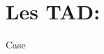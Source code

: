 \documentclass[a4paper,10pts]{article}
\title{}
\author{Simon Lebeaud}
\date{}
\begin{document}
	\maketitle
	\newpage
	\tableofcontents
	\section{Les TAD:}
	\begin{tad}
		\tadParametres{}
		\tadDependances{}
		\begin{tadOperation}{Case}
		\end{tadOperation}
		
		
	\end{tad}
	

	
\end{document}
